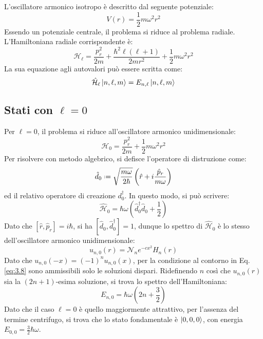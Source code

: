 L'oscillatore armonico isotropo è descritto dal seguente potenziale:
\begin{equation}
	V(r) = \frac{1}{2} m\omega^2 r^2
	\label{eq:3.20}
\end{equation}
Essendo un potenziale centrale, il problema si riduce al problema radiale.
L'Hamiltoniana radiale corrispondente è:
\begin{equation}
	\mathcal{H}_{\ell} = \frac{p_r^2}{2m} + \frac{\hbar^2 \ell(\ell + 1)}{2mr^2} + \frac{1}{2} m\omega^2 r^2
	\label{eq:3.21}
\end{equation}
La sua equazione agli autovalori può essere scritta come:
\begin{equation}
	\hat{\mathcal{H}}_{\ell} \ket{n,\ell,m} = E_{n,\ell} \ket{n,\ell,m}
	\label{eq:3.22}
\end{equation}

\subsection{Stati con \texorpdfstring{$ \ell = 0 $}{TEXT}}

Per $ \ell = 0 $, il problema si riduce all'oscillatore armonico unidimensionale:
\begin{equation}
	\mathcal{H}_0 = \frac{p_r^2}{2m} + \frac{1}{2} m \omega^2 r^2
	\label{eq:3.23}
\end{equation}
Per risolvere con metodo algebrico, si defisce l'operatore di distruzione come:
\begin{equation}
	\hat{d}_0 \defeq \sqrt{\frac{m\omega}{2\hbar}} \left( \hat{r} + i \frac{\hat{p}_r}{m\omega} \right)
	\label{eq:3.24}
\end{equation}
ed il relativo operatore di creazione $ d_0^{\dagger} $. In questo modo, si può scrivere:
\begin{equation}
	\hat{\mathcal{H}}_0 = \hbar \omega \left( \hat{d}_0^{\dagger}\hat{d}_0 + \frac{1}{2} \right)
	\label{eq:3.25}
\end{equation}
Dato che $ \left[ \hat{r},\hat{p}_r \right] = i\hbar $, si ha $ \left[ \hat{d}_0, \hat{d}_0^{\dagger} \right] = 1 $, dunque lo spettro di $ \hat{\mathcal{H}}_0 $ è lo stesso dell'oscillatore armonico unidimensionale:
\begin{equation}
	u_{n,0}(r) = \mathcal{N}_n e^{-c x^2} H_n(r)
	\label{eq:3.26}
\end{equation}
Dato che $ u_{n,0}(-x) = (-1)^n u_{n,0}(x) $, per la condizione al contorno in Eq. \ref{eq:3.8} sono ammissibili solo le soluzioni dispari. Ridefinendo $ n $ così che $ u_{n,0}(r) $ sia la $ (2n+1) $-esima soluzione, si trova lo spettro dell'Hamiltoniana:
\begin{equation}
	E_{n,0} = \hbar \omega \left( 2n + \frac{3}{2} \right)
	\label{eq:3.27}
\end{equation}
Dato che il caso $ \ell = 0 $ è quello maggiormente attrattivo, per l'assenza del termine centrifugo, si trova che lo stato fondamentale è $ \ket{0,0,0} $, con energia $ E_{0,0} = \frac{3}{2} \hbar \omega $.

